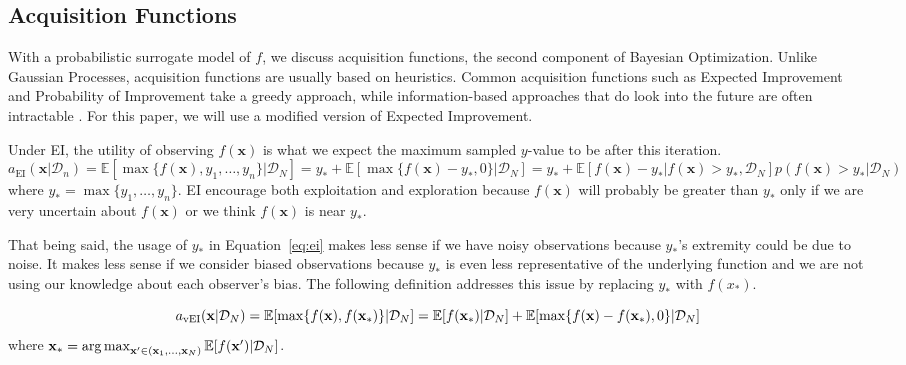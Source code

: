 \subsection{Acquisition Functions}

With a probabilistic surrogate model of $f$, we discuss acquisition functions, the second component of Bayesian Optimization.
Unlike Gaussian Processes, acquisition functions are usually based on heuristics.
Common acquisition functions such as Expected Improvement and Probability of Improvement take a greedy approach, while information-based approaches that do look into the future are often intractable \cite{shahriari2016}.
For this paper, we will use a modified version of Expected Improvement.

Under EI, the utility of observing $f(\mathbf{x})$ is what we expect the maximum sampled $y$-value to be after this iteration.
\begin{equation}
    \label{eq:ei}
    a_{\mathrm{EI}}(\mathbf{x} | \mathcal{D}_n) = \mathbb{E}[\max\{f(\mathbf{x}), y_1, \dots, y_n\} | \mathcal{D}_N]
    = y_* + \mathbb{E}[\max\{f(\mathbf{x}) - y_*, 0\} |\mathcal{D}_N]
    = y_* + \mathbb{E}[f(\mathbf{x}) - y_* | f(\mathbf{x}) > y_*, \mathcal{D}_N]p(f(\mathbf{x}) > y_* | \mathcal{D}_N)
\end{equation}
where $y_* = \max\{y_1, \dots, y_n\}$.
EI encourage both exploitation and exploration because $f(\mathbf{x})$ will probably be greater than $y_*$
only if we are very uncertain about $f(\mathbf{x})$ or we think $f(\mathbf{x})$ is near $y_*$.

That being said, the usage of $y_*$ in Equation~\ref{eq:ei} makes less sense if we have noisy observations because $y_*$'s extremity could be due to noise.
It makes less sense if we consider biased observations because $y_*$ is even less representative of the underlying function and we are not using our knowledge about each observer's bias.
The following definition addresses this issue by replacing $y_*$ with $f(x_*)$.

\begin{definition}[vEI]
    \begin{equation}
        \label{eq:vei}
        a_{\mathrm{vEI}}(\mathbf{x} | \mathcal{D}_N) = \mathbb{E}[\max \{ f(\mathbf{x}), f(\mathbf{x}_*) \} | \mathcal{D}_N]
        = \mathbb{E}[f(\mathbf{x}_*) | \mathcal{D}_N] + \mathbb{E}[\max \{ f(\mathbf{x}) - f(\mathbf{x}_*), 0 \} | \mathcal{D}_N]
    \end{equation}
    where $\mathbf{x}_* = \operatorname*{arg\,max}_{\mathbf{x'} \in (\mathbf{x}_1, \dots, \mathbf{x}_N)} \mathbb{E}[f(\mathbf{x'}) | \mathcal{D}_N]$.
\end{definition}

